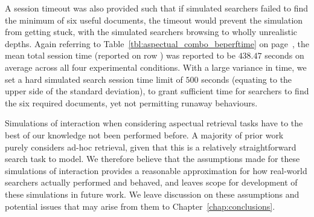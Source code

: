 A session timeout was also provided such that if simulated searchers failed to find the minimum of six useful documents, the timeout would prevent the simulation from getting stuck, with the simulated searchers browsing to wholly unrealistic depths. Again referring to Table~\ref{tbl:aspectual_combo_beperftime} on page~\pageref{tbl:aspectual_combo_beperftime}, the mean total session time (reported on row ) was reported to be $438.47$ seconds on average across all four experimental conditions. With a large variance in time, we set a hard simulated search session time limit of $500$ seconds (equating to the upper side of the standard deviation), to grant sufficient time for searchers to find the six required documents, yet not permitting runaway behaviours.

Simulations of interaction when considering aspectual retrieval tasks have to the best of our knowledge not been performed before. A majority of prior work purely considers ad-hoc retrieval, given that this is a relatively straightforward search task to model. We therefore believe that the assumptions made for these simulations of interaction provides a reasonable approximation for how real-world searchers actually performed and behaved, and leaves scope for development of these simulations in future work. We leave discussion on these assumptions and potential issues that may arise from them to Chapter~\ref{chap:conclusions}.

